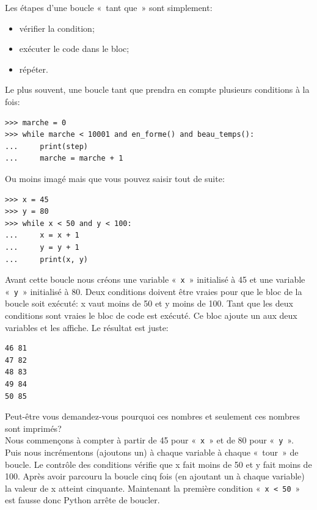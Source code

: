 Les étapes d'une boucle « tant que » sont simplement:
\begin{itemize}
\item vérifier la condition;
\item exécuter le code dans le bloc;
\item répéter.
\end{itemize}

Le plus souvent, une boucle tant que prendra en compte plusieurs conditions à la fois:

\begin{Verbatim}[frame=single,rulecolor=\color{gray}, label=ne pas saisir]
>>> marche = 0
>>> while marche < 10001 and en_forme() and beau_temps():
...     print(step)
...     marche = marche + 1 
\end{Verbatim}

Ou moins imagé mais que vous pouvez saisir tout de suite:

\begin{Verbatim}[frame=single,rulecolor=\color{mbleu}, label=à taper]
>>> x = 45
>>> y = 80
>>> while x < 50 and y < 100:
...     x = x + 1
...     y = y + 1
...     print(x, y)
\end{Verbatim}

Avant cette boucle nous créons une variable « \texttt{x} »  initialisé à 45 et une variable « \texttt{y} » initialisé à 80. Deux conditions doivent être vraies pour que le bloc de la boucle soit exécuté: x vaut moins de 50 et y moins de 100. Tant que les deux conditions sont vraies le bloc de code est exécuté. Ce bloc ajoute un aux deux variables et les affiche. Le résultat est juste:

\begin{Verbatim}[frame=single,rulecolor=\color{gray}, label=ne pas saisir]
46 81
47 82
48 83
49 84
50 85
\end{Verbatim}

Peut-être vous demandez-vous pourquoi ces nombres et seulement ces nombres sont imprimés?\\

Nous commençons à compter à partir de 45 pour « \texttt{x} »  et de 80 pour « \texttt{y} ». Puis nous incrémentons (ajoutons un) à chaque variable à chaque « tour » de boucle. Le contrôle des conditions vérifie que x fait moins de 50 et y fait moins de 100. Après avoir parcouru la boucle cinq fois (en ajoutant un à chaque variable) la valeur de x atteint cinquante. Maintenant la première condition « \texttt{x < 50} »  est fausse donc Python arrête de boucler.

